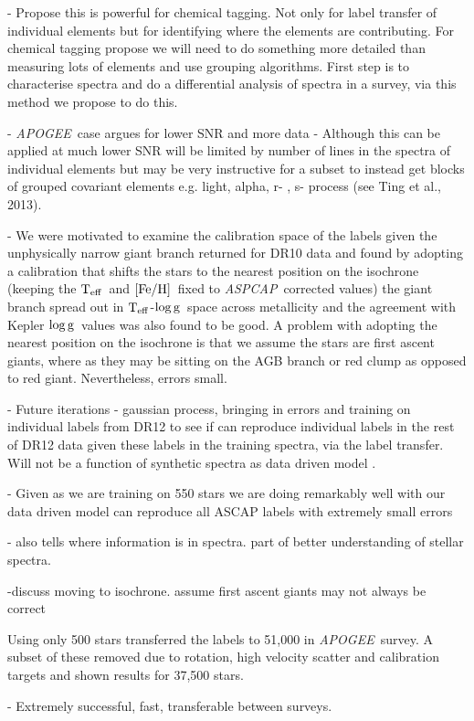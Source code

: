 \documentclass[12pt, preprint]{aastex}
\newcommand{\teff}{\mbox{$\rm T_{eff}$}}
\newcommand{\feh}{\mbox{$\rm [Fe/H]$}}
\newcommand{\logg}{\mbox{$\rm \log g$}}
\newcommand{\apogee}{\textsl{APOGEE}}
\newcommand{\aspcap}{\textsl{ASPCAP}}
\begin{document}
- Propose this is powerful for chemical tagging. Not only for label transfer of individual elements but for identifying where the elements are contributing. For chemical tagging propose we will need to do something more detailed than measuring lots of elements and use grouping algorithms. First step is to characterise spectra and do a differential analysis of spectra in a survey, via this method we propose to do this. 

- \apogee\ case argues for lower SNR and more data - Although this can be applied at much lower SNR will be limited by number of lines in the spectra of individual elements but may be very instructive for a subset to instead get blocks of grouped covariant elements e.g. light, alpha, r- , s- process (see Ting et al., 2013).


- We were motivated to examine the calibration space of the labels given the unphysically narrow giant branch returned for DR10 data and found by adopting a calibration that shifts the stars to the nearest position on the isochrone (keeping the \teff\ and \feh\ fixed to \aspcap\ corrected values) the giant branch spread out in \teff-\logg\ space across metallicity and the agreement with Kepler \logg\ values was also found to be good. A problem with adopting the nearest position on the isochrone is that we assume the stars are first ascent giants, where as they may be sitting on the AGB branch or red clump as opposed to red giant. Nevertheless, errors small. 

- Future iterations - gaussian process, bringing in errors and training on individual labels from DR12 to see if can reproduce individual labels in the rest of DR12 data given these labels in the training spectra, via the label transfer. Will not be a function of synthetic spectra as data driven model . 

- Given as we are training on 550 stars we are doing remarkably well with our data driven model can reproduce all ASCAP labels with extremely small errors

- also tells where information is in spectra. part of better understanding of stellar spectra. 

-discuss moving to isochrone. assume first ascent giants may not always be correct

Using only 500 stars transferred the labels to 51,000 in \apogee\ survey. A subset of these removed due to rotation, high velocity scatter and calibration targets and shown results for 37,500 stars. 

- Extremely successful, fast, transferable between surveys. 
\end{document}
